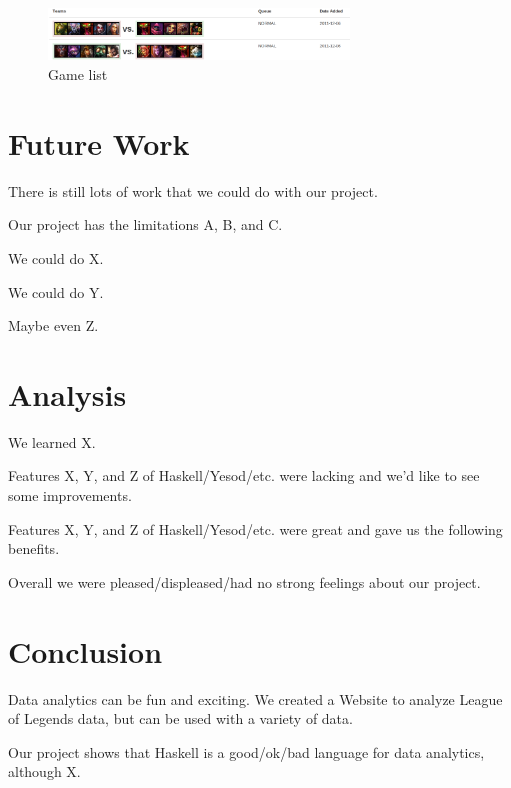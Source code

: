 \documentclass{chi2009}
\begin{document}
\begin{figure}[h]
    \includegraphics[width=80mm]{imgs/gamelist.png}
    \caption{Game list}
    \label{list}
\end{figure}

\section{Future Work}
\label{future}

There is still lots of work that we could do with our project.

Our project has the limitations A, B, and C. 

We could do X.

We could do Y.

Maybe even Z.

\section{Analysis}
\label{analysis}

We learned X.

Features X, Y, and Z of Haskell/Yesod/etc. were lacking and we'd like to see some improvements.

Features X, Y, and Z of Haskell/Yesod/etc. were great and gave us the following benefits.

Overall we were pleased/displeased/had no strong feelings about our project.

\section{Conclusion}
\label{conclusion}

Data analytics can be fun and exciting. We created a Website to analyze League of Legends data, but can be used with a variety of data.

Our project shows that Haskell is a good/ok/bad language for data analytics, although X. 



\end{document}
